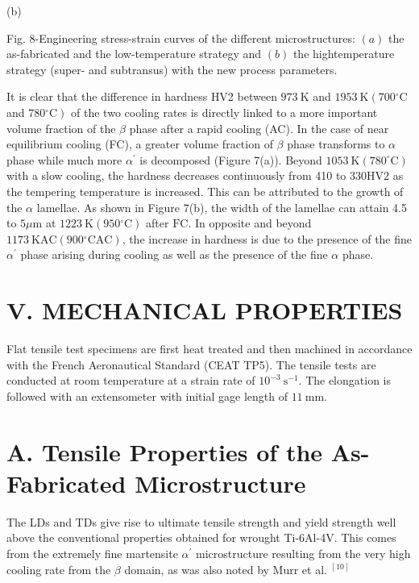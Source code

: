 \documentclass[10pt]{article}
\begin{document}
(b)

Fig. 8-Engineering stress-strain curves of the different microstructures: $(a)$ the as-fabricated and the low-temperature strategy and $(b)$ the hightemperature strategy (super- and subtransus) with the new process parameters.

It is clear that the difference in hardness HV2 between $973 \mathrm{~K}$ and $1953 \mathrm{~K}\left(700{ }^{\circ} \mathrm{C}\right.$ and $\left.780{ }^{\circ} \mathrm{C}\right)$ of the two cooling rates is directly linked to a more important volume fraction of the $\beta$ phase after a rapid cooling (AC). In the case of near equilibrium cooling (FC), a greater volume fraction of $\beta$ phase transforms to $\alpha$ phase while much more $\alpha^{\prime}$ is decomposed (Figure 7(a)). Beyond $1053 \mathrm{~K}\left(780^{\circ} \mathrm{C}\right)$ with a slow cooling, the hardness decreases continuously from 410 to $330 \mathrm{HV} 2$ as the tempering temperature is increased. This can be attributed to the growth of the $\alpha$ lamellae. As shown in Figure 7(b), the width of the lamellae can attain 4.5 to $5 \mu \mathrm{m}$ at $1223 \mathrm{~K}\left(950{ }^{\circ} \mathrm{C}\right)$ after $\mathrm{FC}$. In opposite and beyond $1173 \mathrm{~K} \mathrm{AC}\left(900{ }^{\circ} \mathrm{C} \mathrm{AC}\right)$, the increase in hardness is due to the presence of the fine $\alpha^{\prime}$ phase arising during cooling as well as the presence of the fine $\alpha$ phase.

\section*{V. MECHANICAL PROPERTIES}
Flat tensile test specimens are first heat treated and then machined in accordance with the French Aeronautical Standard (CEAT TP5). The tensile tests are conducted at room temperature at a strain rate of $10^{-3} \mathrm{~s}^{-1}$. The elongation is followed with an extensometer with initial gage length of $11 \mathrm{~mm}$.

\section*{A. Tensile Properties of the As-Fabricated Microstructure}
The LDs and TDs give rise to ultimate tensile strength and yield strength well above the conventional properties obtained for wrought Ti-6Al-4V. This comes from the extremely fine martensite $\alpha^{\prime}$ microstructure resulting from the very high cooling rate from the $\beta$ domain, as was also noted by Murr et al. ${ }^{[10]}$
\end{document}
